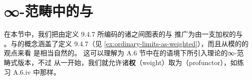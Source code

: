 \providecommand{\HomA}{\mathrm{Hom}_{A}}
\providecommand{\HomB}{\mathrm{Hom}_{B}}
\providecommand{\HomC}{\mathrm{Hom}_{C}}
\providecommand{\colim}{\mathop{\mathrm{colim}}\nolimits}
\providecommand{\ran}{\mathop{\mathrm{ran}}\nolimits}
\providecommand{\lan}{\mathop{\mathrm{lan}}\nolimits}

\section{∞-范畴中的\trWeightedLimit{}与\trWeightedColimit{}}\label{sec:weighted-limits-and-colimits-in-infinity-categories}

在本节中，我们把由定义 9.4.7 所编码的诸\trInfinityCategory{}之间图表的\trLimit{}与%
\trColimit{}推广为由一支\trModule{}加权的\trLimit{}与\trColimit%
。\trWeightedLimit{}与\trWeightedColimit{}的概念涵盖了定义 9.4.7（见%
\cref{ex:ordinary-limits-as-weighted}），而且从模的\trVirtualEquipment{}的观点来看
是相当自然的。
这可以理解为 A.6 节中在\trEnrichedCategory{}的语境下所引入理论的∞-范畴式版本，不过
从一开始，我们就允许诸\textbf{权}（weight）取为\textbf{\trProfunctor}（profunctor），如练习
A.6.iv 中那样。

